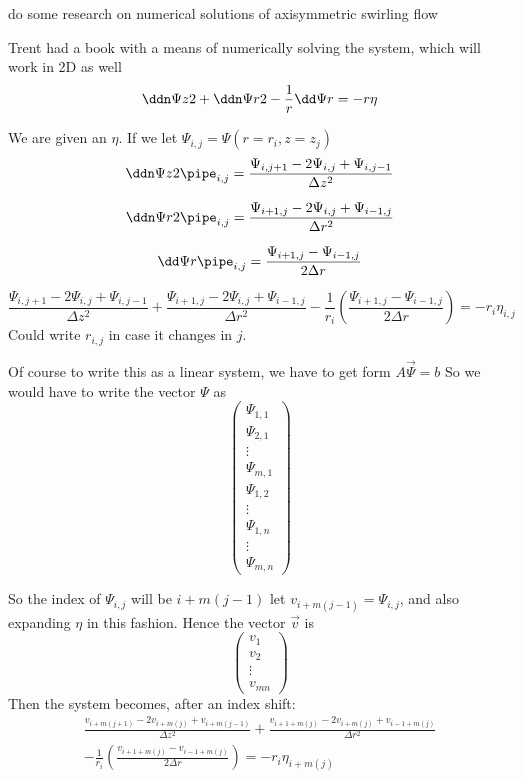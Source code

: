 \documentclass{X:/Documents/Coding/Latex/myreport}
\begin{document}
do some research on numerical solutions of axisymmetric swirling flow 



Trent had a book with a means of numerically solving the system, which will work in 2D as well
\[\ddn \Psi z 2 + \ddn \Psi r2 - \frac1r \dd \Psi r = - r \eta\]

We are given an $\eta$. 
If we let $\Psi_{i,j} = \Psi(r = r_i, z = z_j)$
\[\ddn \Psi z2\pipe_{i,j} = \frac{\Psi_{i,j+1} - 2 \Psi_{i,j} + \Psi_{i,j-1}}{\Delta z^2}\]

\[\ddn \Psi r2\pipe_{i,j} = \frac{\Psi_{i+1,j} - 2 \Psi_{i,j} + \Psi_{i-1,j}}{\Delta r^2}\]

\[\dd \Psi r \pipe_{i,j} = \frac{\Psi_{i+1,j} - \Psi_{i-1,j}}{2 \Delta r}\]

\[\frac{\Psi_{i,j+1} - 2 \Psi_{i,j} + \Psi_{i,j-1}}{\Delta z^2} + \frac{\Psi_{i+1,j} - 2 \Psi_{i,j} + \Psi_{i-1,j}}{\Delta r^2} - \frac1{r_i} \left( \frac{\Psi_{i+1,j} - \Psi_{i-1,j}}{2 \Delta r}\right) = - r_i \eta_{i,j}\]
Could write $r_{i,j}$ in case it changes in $j$.

Of course to write this as a linear system, we have to get form $A\vec \Psi = b $
So we would have to write the vector $\Psi$ as 
\[\begin{pmatrix}
    \Psi_{1,1}\\
    \Psi_{2,1}\\
    \vdots\\
    \Psi_{m,1}\\
    \Psi_{1,2}\\
    \vdots\\
    \Psi_{1,n}\\
    \vdots\\
    \Psi_{m,n}
\end{pmatrix}\]

So the index of $\Psi_{i,j}$ will be $i + m(j-1)$ let $v_{i+m(j-1)} = \Psi_{i,j}$, and also expanding $\eta$ in this fashion.
Hence the vector $\vec v$ is
\[\begin{pmatrix}
    v_1\\
    v_2\\
    \vdots\\
    v_{mn}
\end{pmatrix}\]
Then the system becomes, after an index shift:
\begin{align*}
    \frac{v_{i+m(j+1)} - 2 v_{i+m(j)} + v_{i+m(j-1)}}{\Delta z^2} + \frac{v_{i+1+m(j)} - 2 v_{i+m(j)} + v_{i-1+m(j)}}{\Delta r^2}\\
     - \frac1{r_i} \left( \frac{v_{i+1+m(j)} - v_{i-1+m(j)}}{2 \Delta r}\right) = - r_i \eta_{i+m(j)}\\
\end{align*}
\end{document}
